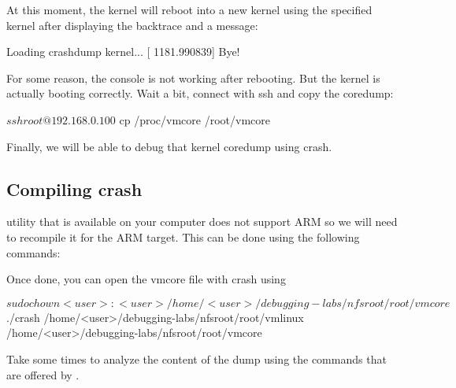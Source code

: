 At this moment, the kernel will reboot into a new kernel using the specified
kernel after displaying the backtrace and a message:

\begin{bashinput}
[ 1181.987971] Loading crashdump kernel...
[ 1181.990839] Bye!
\end{bashinput}

For some reason, the console is not working after rebooting. But the kernel is
actually booting correctly. Wait a bit, connect with ssh and copy the coredump:

\begin{bashinput}
$ ssh root@192.168.0.100
$ cp /proc/vmcore /root/vmcore
\end{bashinput}

Finally, we will be able to debug that kernel coredump using crash.

\subsection{Compiling crash}

 utility that is available on your computer does not support ARM
so we will need to recompile it for the ARM target. This can be done using the
following commands:


Once done, you can open the vmcore file with crash using
\begin{bashinput}
$ sudo chown <user>:<user> /home/<user>/debugging-labs/nfsroot/root/vmcore
$ ./crash /home/<user>/debugging-labs/nfsroot/root/vmlinux 
  /home/<user>/debugging-labs/nfsroot/root/vmcore
\end{bashinput}

Take some times to analyze the content of the dump using the commands that are
offered by .